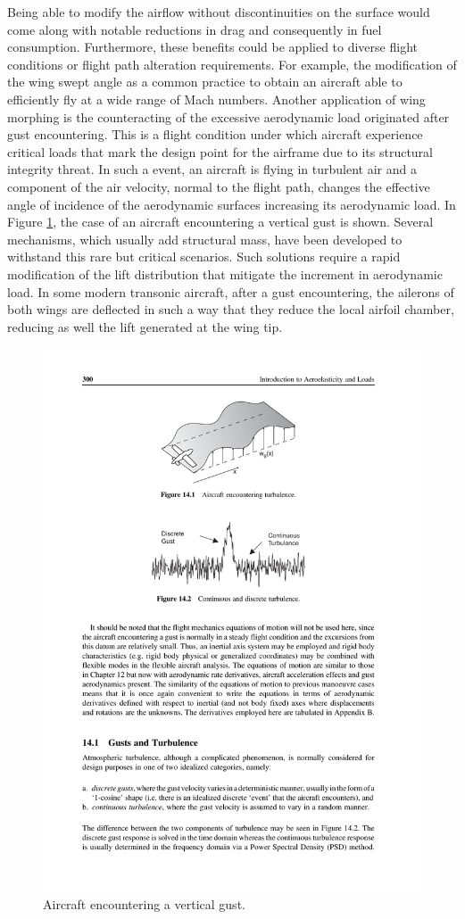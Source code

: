 Being able to modify the airflow without discontinuities on the surface would come along with notable reductions in drag and consequently in fuel consumption. Furthermore, these benefits could be applied to diverse flight conditions or flight path alteration requirements. For example, the modification of the wing swept angle as a common practice to obtain an aircraft able to efficiently fly at a wide range of Mach numbers. Another application of wing morphing is the counteracting of the excessive aerodynamic load originated after gust encountering. This is a flight condition under which aircraft experience critical loads that mark the design point for the airframe due to its structural integrity threat. In such a event, an aircraft is flying in turbulent air and a component of the air velocity, normal to the flight path, changes the effective angle of incidence of the aerodynamic surfaces increasing its aerodynamic load. In Figure \ref{fig:gust}, the case of an aircraft encountering a vertical gust is shown. Several mechanisms, which usually add structural mass, have been developed to withstand this rare but critical scenarios. Such solutions require a rapid modification of the lift distribution that mitigate the increment in aerodynamic load. In some modern transonic aircraft, after a gust encountering, the ailerons of both wings are deflected in such a way that they reduce the local airfoil chamber, reducing as well the lift generated at the wing tip.

\begin{figure}[!htpb]
  \centering
  \includegraphics[width=0.7 \textwidth]{figures/state-of-the-art/gust}
  \caption[Aircraft encountering a vertical gust]{Aircraft encountering a vertical gust. \cite{JECooper2007}}\label{fig:gust}
\end{figure}


